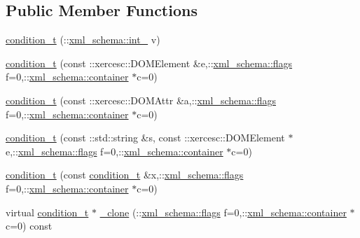 \subsection*{Public Member Functions}
\begin{DoxyCompactItemize}
\item 
\hyperlink{classcondition__t_a4c55f19277dbee716114fedde266660d}{condition\-\_\-t} (\-::\hyperlink{namespacexml__schema_acfa24ac68e1a188e7f44c36f7a158bf4}{xml\-\_\-schema\-::int\-\_\-} v)
\item 
\hyperlink{classcondition__t_a5d2e40caebc70537ef8f9e4fb51db4e6}{condition\-\_\-t} (const \-::xercesc\-::\-D\-O\-M\-Element \&e,\-::\hyperlink{namespacexml__schema_a0612287d030cb2732d31a45b258fdc87}{xml\-\_\-schema\-::flags} f=0,\-::\hyperlink{namespacexml__schema_ada9aa30dc722e93ee2ed7243085402a5}{xml\-\_\-schema\-::container} $\ast$c=0)
\item 
\hyperlink{classcondition__t_a804488dd639127e428efa9b953aefd68}{condition\-\_\-t} (const \-::xercesc\-::\-D\-O\-M\-Attr \&a,\-::\hyperlink{namespacexml__schema_a0612287d030cb2732d31a45b258fdc87}{xml\-\_\-schema\-::flags} f=0,\-::\hyperlink{namespacexml__schema_ada9aa30dc722e93ee2ed7243085402a5}{xml\-\_\-schema\-::container} $\ast$c=0)
\item 
\hyperlink{classcondition__t_a2bb3d5ba5abb832f78301c132f1e000d}{condition\-\_\-t} (const \-::std\-::string \&s, const \-::xercesc\-::\-D\-O\-M\-Element $\ast$e,\-::\hyperlink{namespacexml__schema_a0612287d030cb2732d31a45b258fdc87}{xml\-\_\-schema\-::flags} f=0,\-::\hyperlink{namespacexml__schema_ada9aa30dc722e93ee2ed7243085402a5}{xml\-\_\-schema\-::container} $\ast$c=0)
\item 
\hyperlink{classcondition__t_a69909b9e1c95ec62bee98ea62dac883c}{condition\-\_\-t} (const \hyperlink{classcondition__t}{condition\-\_\-t} \&x,\-::\hyperlink{namespacexml__schema_a0612287d030cb2732d31a45b258fdc87}{xml\-\_\-schema\-::flags} f=0,\-::\hyperlink{namespacexml__schema_ada9aa30dc722e93ee2ed7243085402a5}{xml\-\_\-schema\-::container} $\ast$c=0)
\item 
virtual \hyperlink{classcondition__t}{condition\-\_\-t} $\ast$ \hyperlink{classcondition__t_aa04a724a1775f464a7b8e91d3989d298}{\-\_\-clone} (\-::\hyperlink{namespacexml__schema_a0612287d030cb2732d31a45b258fdc87}{xml\-\_\-schema\-::flags} f=0,\-::\hyperlink{namespacexml__schema_ada9aa30dc722e93ee2ed7243085402a5}{xml\-\_\-schema\-::container} $\ast$c=0) const 
\end{DoxyCompactItemize}


